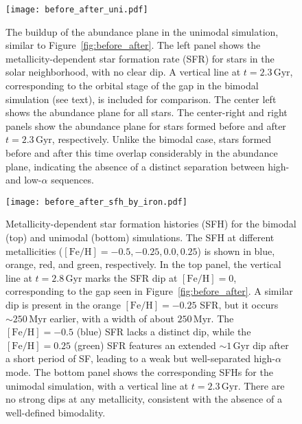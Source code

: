 \documentclass[twocolumn,linenumbers,trackchanges]{aastex631}
\newcommand{\Gyr}{\ensuremath{\textrm{Gyr}}}
\newcommand{\Myr}{\ensuremath{\textrm{Myr}}}
\newcommand{\FeH}{\ensuremath{[\textrm{Fe}/\textrm{H}]}}
\begin{document}
\begin{figure*}
  \centering
  \texttt{[image: before\_after\_uni.pdf]}
  \caption{The buildup of the abundance plane in the unimodal simulation, similar to Figure~\ref{fig:before_after}. The left panel shows the metallicity-dependent star formation rate (SFR) for stars in the solar neighborhood, with no clear dip. A vertical line at $t=2.3\,\Gyr$, corresponding to the orbital stage of the gap in the bimodal simulation (see text), is included for comparison. The center left shows the abundance plane for all stars. The center-right and right panels show the abundance plane for stars formed before and after $t=2.3\,\Gyr$, respectively. Unlike the bimodal case, stars formed before and after this time overlap considerably in the abundance plane, indicating the absence of a distinct separation between high- and low-$\alpha$ sequences.}
  \label{fig:before_after_uni}
\end{figure*}

\begin{figure}
  \centering
  \texttt{[image: before\_after\_sfh\_by\_iron.pdf]}
  \caption{Metallicity-dependent star formation histories (SFH) for the bimodal (top) and unimodal (bottom) simulations. The SFH at different metallicities ($\FeH=-0.5, -0.25, 0.0, 0.25$) is shown in blue, orange, red, and green, respectively. In the top panel, the vertical line at $t=2.8\,\Gyr$ marks the SFR dip at $\FeH=0$, corresponding to the gap seen in Figure~\ref{fig:before_after}. A similar dip is present in the orange $\FeH=-0.25$ SFR, but it occurs $\sim250\,\Myr$ earlier, with a width of about $250\,\Myr$. The $\FeH=-0.5$ (blue) SFR lacks a distinct dip, while the $\FeH=0.25$ (green) SFR features an extended $\sim1\,\Gyr$ dip after a short period of SF, leading to a weak but well-separated high-$\alpha$ mode. The bottom panel shows the corresponding SFHs for the unimodal simulation, with a vertical line at $t=2.3\,\Gyr$. There are no strong dips at any metallicity, consistent with the absence of a well-defined bimodality.}
  \label{fig:before_after_sfh_by_iron}
\end{figure}
\end{document}
